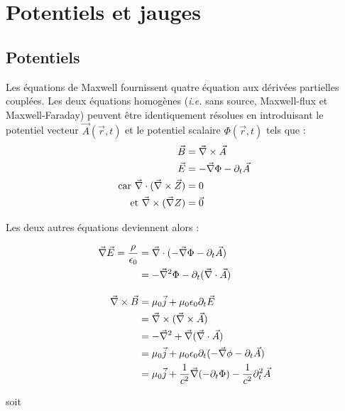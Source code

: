 \section{Potentiels et jauges}
\subsection{Potentiels}
	Les équations de Maxwell fournissent quatre équation aux dérivées partielles couplées. Les deux équations homogènes ({\it i.e.} sans source, Maxwell-flux et Maxwell-Faraday) peuvent être identiquement résolues en introduisant le potentiel vecteur $\vec{A}(\vec{r},t)$ et le potentiel scalaire $\Phi(\vec{r},t)$ tels que :
	\begin{align*}
		\vec{B}&=\vec{\nabla}\times\vec{A}\\
		\vec{E}&=-\vec{\nabla}\Phi-\partial_t\vec{A}\\
		\text{car } \vec{\nabla}\cdot(\vec{\nabla}\times\vec{Z})&=0\\
		\text{et }\vec{\nabla}\times(\vec{\nabla} Z)&=\vec{0}
	\end{align*}
	
	Les deux autres équations deviennent alors :
	
	\begin{align*}
		\vec{\nabla}\vec{E}=\frac{\rho}{\epsilon_0}&=\vec{\nabla}\cdot(-\vec{\nabla}\Phi-\partial_t\vec{A})\\
		&=-\vec{\nabla}^2\Phi-\partial_t(\vec{\nabla}\cdot\vec{A})\\[10pt]
		\vec{\nabla}\times\vec{B}&=\mu_0\vec{j}+\mu_0\epsilon_0\partial_t\vec{E}\\
		&=\vec{\nabla}\times(\vec{\nabla}\times\vec{A})\\
		&=-\vec{\nabla}^2+\vec{\nabla}(\vec{\nabla}\cdot\vec{A})\\
		&=\mu_0\vec{j}+\mu_0\epsilon_0\partial_t(-\vec{\nabla}\phi-\partial_t\vec{A})\\
		&=\mu_0\vec{j}+\frac{1}{c^2}\vec{\nabla}(-\partial_t\Phi)-\frac{1}{c^2}\partial_t^2\vec{A}
	\end{align*}
	
	soit 
	\\
	
